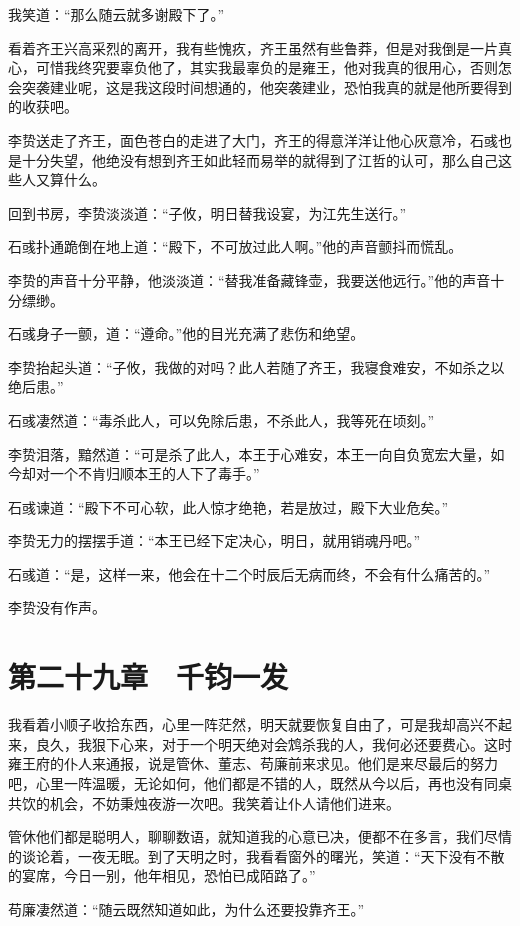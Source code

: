 我笑道：“那么随云就多谢殿下了。”

看着齐王兴高采烈的离开，我有些愧疚，齐王虽然有些鲁莽，但是对我倒是一片真心，可惜我终究要辜负他了，其实我最辜负的是雍王，他对我真的很用心，否则怎会突袭建业呢，这是我这段时间想通的，他突袭建业，恐怕我真的就是他所要得到的收获吧。

李贽送走了齐王，面色苍白的走进了大门，齐王的得意洋洋让他心灰意冷，石彧也是十分失望，他绝没有想到齐王如此轻而易举的就得到了江哲的认可，那么自己这些人又算什么。

回到书房，李贽淡淡道：“子攸，明日替我设宴，为江先生送行。”

石彧扑通跪倒在地上道：“殿下，不可放过此人啊。”他的声音颤抖而慌乱。

李贽的声音十分平静，他淡淡道：“替我准备藏锋壶，我要送他远行。”他的声音十分缥缈。

石彧身子一颤，道：“遵命。”他的目光充满了悲伤和绝望。

李贽抬起头道：“子攸，我做的对吗？此人若随了齐王，我寝食难安，不如杀之以绝后患。”

石彧凄然道：“毒杀此人，可以免除后患，不杀此人，我等死在顷刻。”

李贽泪落，黯然道：“可是杀了此人，本王于心难安，本王一向自负宽宏大量，如今却对一个不肯归顺本王的人下了毒手。”

石彧谏道：“殿下不可心软，此人惊才绝艳，若是放过，殿下大业危矣。”

李贽无力的摆摆手道：“本王已经下定决心，明日，就用销魂丹吧。”

石彧道：“是，这样一来，他会在十二个时辰后无病而终，不会有什么痛苦的。”

李贽没有作声。

\chapter{第二十九章　千钧一发}

我看着小顺子收拾东西，心里一阵茫然，明天就要恢复自由了，可是我却高兴不起来，良久，我狠下心来，对于一个明天绝对会鸩杀我的人，我何必还要费心。这时雍王府的仆人来通报，说是管休、董志、苟廉前来求见。他们是来尽最后的努力吧，心里一阵温暖，无论如何，他们都是不错的人，既然从今以后，再也没有同桌共饮的机会，不妨秉烛夜游一次吧。我笑着让仆人请他们进来。

管休他们都是聪明人，聊聊数语，就知道我的心意已决，便都不在多言，我们尽情的谈论着，一夜无眠。到了天明之时，我看看窗外的曙光，笑道：“天下没有不散的宴席，今日一别，他年相见，恐怕已成陌路了。”

苟廉凄然道：“随云既然知道如此，为什么还要投靠齐王。”

